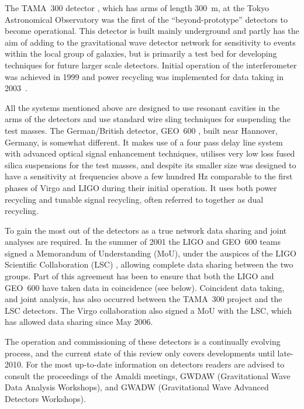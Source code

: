 \documentclass{article}
\begin{document}
The TAMA~300 detector \cite{TAMAweb}, which has arms of length 300~m, at the
Tokyo Astronomical Observatory was the first of the ``beyond-prototype'' detectors
to become operational. This detector is built mainly underground and partly has
the aim of adding to the gravitational wave detector network for sensitivity to
events within the local group of galaxies, but is primarily a test bed for 
developing techniques for future larger scale detectors. Initial operation of
the interferometer was achieved in 1999 and power recycling was implemented for
data taking in 2003~\cite{Arai:2003}.

All the systems mentioned above are designed to use resonant cavities in the
arms of the detectors and use standard wire sling techniques for suspending the
test masses. The German/British detector, GEO~600 \cite{GEOweb}, built near
Hannover, Germany, is somewhat different. It makes use of a four pass delay line
system with advanced optical signal enhancement techniques, utilises very low
loss fused silica suspensions for the test masses, and despite its smaller size 
was designed to have a
sensitivity at frequencies above a few hundred Hz comparable to the first phases
of Virgo and LIGO during their initial operation. It uses both power
recycling and tunable signal recycling, often referred to together as dual
recycling.

To gain the most out of the detectors as a true network data sharing and joint
analyses are required. In the summer of 2001 the LIGO and GEO~600 teams signed a
Memorandum of Understanding (MoU), under the auspices of the LIGO Scientific
Collaboration (LSC) \cite{LSCweb}, allowing complete data sharing between the
two groups. Part of this agreement has been to ensure that both the LIGO and
GEO~600 have taken data in coincidence (see below). Coincident data taking,
and joint analysis, has also occurred between the TAMA~300 project and the LSC
detectors. The Virgo collaboration also signed a MoU with the LSC, which 
has allowed data sharing since May 2006.

The operation and commissioning of these detectors is a continually evolving 
process, and the current state of this review only covers developments until late-2010.
For the most up-to-date information on detectors readers are advised to consult
the proceedings of the Amaldi meetings, GWDAW (Gravitational Wave Data Analysis
Workshops), and GWADW (Gravitational Wave Advanced Detectors Workshops).
\end{document}
